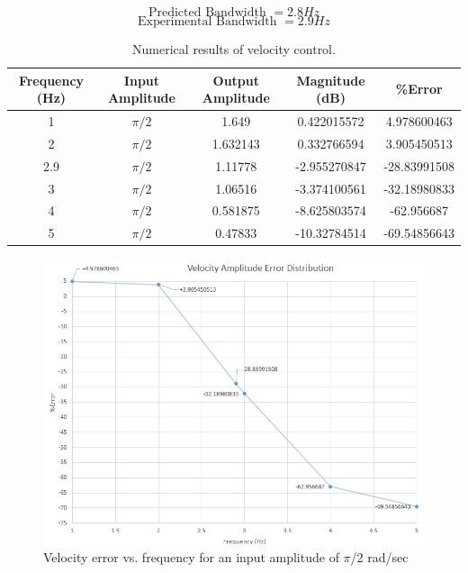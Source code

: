 \documentclass{article}
\theoremstyle{plain}
\theoremstyle{definition}
\theoremstyle{remark}
\begin{document}
$$\text{Predicted Bandwidth } =  2.8 Hz$$
$$\text{Experimental Bandwidth } =  2.9 Hz$$

\begin{table}[htb]
    \begin{tabular}{|c|c|c|c|c|}
        \hline
        Frequency (Hz) & Input Amplitude & Output Amplitude & Magnitude (dB) & \%Error      \\ \hline
        1              & $\pi/2$         & 1.649            & 0.422015572    & 4.978600463  \\ 
        2              & $\pi/2$         & 1.632143         & 0.332766594    & 3.905450513  \\ 
        2.9            & $\pi/2$         & 1.11778          & -2.955270847   & -28.83991508 \\ 
        3              & $\pi/2$         & 1.06516          & -3.374100561   & -32.18980833 \\ 
        4              & $\pi/2$         & 0.581875         & -8.625803574   & -62.956687   \\ 
        5              & $\pi/2$         & 0.47833          & -10.32784514   & -69.54856643 \\
        \hline
    \end{tabular}
    \caption{Numerical results of velocity control.}
    \label{q6_table}
\end{table}

\begin{figure}[htb]
\begin{center}
\includegraphics[width = 14cm]{VelocityControl_Error.png}
\caption{Velocity error vs. frequency for an input amplitude of $\pi$/2 rad/sec}
\label{VelFreqError}
\end{center}
\end{figure}
\end{document}
